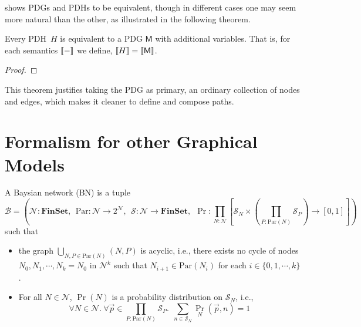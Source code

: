 \documentclass{article}
\newcommand{\sfM}{\mathsf M}
\newcommand{\MNH}{PDH}
\numberwithin{equation}{section}
\begin{document}
	 shows PDGs and \MNH s to be equivalent, though in different cases one may seem more natural than the other, as illustrated in the following theorem.
	
	\begin{theorem}[restate=thmhyperequiv]\label{thm:hyperequiv}
		Every \MNH\ $H$ is equivalent to a PDG $\sfM$ with additional variables. That is, for each semantics $\llbracket-\rrbracket$ we define, $\bbr{H} = \bbr{\sfM}$.
	\end{theorem}
	\begin{proof}
		\todo{}
	\end{proof}
	
	This theorem justifies taking the PDG as primary, an ordinary collection of nodes and edges, which makes it cleaner to define and compose paths. 

	
	\section{Formalism for other Graphical Models}
	\begin{defn}
		A Baysian network (BN) is a tuple
		\[
		\mathcal B = \left(\mathcal N : \mathbf{FinSet}, ~~\mathrm{Par}: \mathcal N \to 2^{\mathcal N},~~ \mathcal S: \mathcal N \to \mathbf{FinSet},~~\Pr: \prod_{N : \mathcal N}  \left[ \mathcal S_N \times \left(\prod_{P : \mathrm{Par}(N)} \mathcal S_P\right)  \to [0,1] \right] \right)
		\]
		such that
		\begin{itemize}[nosep]
			\item the graph $\bigcup_{N, P \in \mathrm{Par}(N)}(N, P)$ is acyclic, i.e., there exists no cycle of nodes $N_0, N_1, \cdots, N_k = N_0$ in $\mathcal N^k$ such that $N_{i+1} \in \mathrm{Par}(N_i)$ for each $i \in \{0, 1, \cdots, k\}$.
			\item For all $N \in \mathcal N$, $\Pr(N)$ is a probability distribution on $\mathcal S_N$, i.e., 
			\[ \forall N\in \mathcal N.~\forall \vec{p} \in {\prod_{P : \mathrm{Par}(N)} \mathcal S_P}.~~ \sum_{n \in \mathcal S_{N}} \Pr_N(\vec{p}, n) = 1\]
		\end{itemize}
	\end{defn}
	
\end{document}
